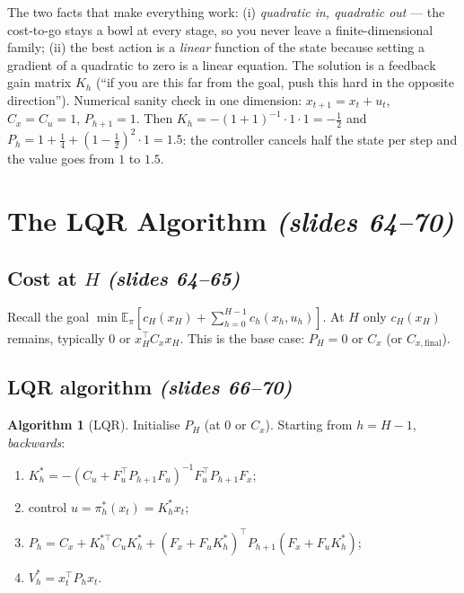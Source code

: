 \documentclass[11pt,a4paper]{article}
\newcommand{\E}{\mathbb{E}}
\newcommand{\slides}[1]{\emph{(slides #1)}}
\theoremstyle{plain}
\theoremstyle{definition}
\newtheorem{algorithm}[theorem]{Algorithm}
\theoremstyle{remark}
\begin{document}
\begin{intuition}
The two facts that make everything work: (i) \emph{quadratic in, quadratic out} --- the cost-to-go stays a bowl at every stage, so you never leave a finite-dimensional family; (ii) the best action is a \emph{linear} function of the state because setting a gradient of a quadratic to zero is a linear equation. The solution is a feedback gain matrix $K_h$ (``if you are this far from the goal, push this hard in the opposite direction''). Numerical sanity check in one dimension: $x_{t+1}=x_t+u_t$, $C_x=C_u=1$, $P_{h+1}=1$. Then $K_h=-(1+1)^{-1}\cdot1\cdot1=-\tfrac12$ and $P_h=1+\tfrac14+(1-\tfrac12)^2\cdot1=1.5$: the controller cancels half the state per step and the value goes from $1$ to $1.5$.
\end{intuition}

\section{The LQR Algorithm \slides{64--70}}

\subsection{Cost at $H$ \slides{64--65}}

Recall the goal $\min\E_\pi[c_H(x_H)+\sum_{h=0}^{H-1}c_h(x_h,u_h)]$. At $H$ only $c_H(x_H)$ remains, typically $0$ or $x_H^\top C_xx_H$. This is the base case: $P_H=0$ or $C_x$ (or $C_{x,\mathrm{final}}$).

\subsection{LQR algorithm \slides{66--70}}

\begin{algorithm}[LQR]\label{alg:lqr}
Initialise $P_H$ (at $0$ or $C_x$). Starting from $h=H-1$, \emph{backwards}:
\begin{enumerate}[nosep]
  \item $K^*_h=-(C_u+F_u^\top P_{h+1}F_u)^{-1}F_u^\top P_{h+1}F_x$;
  \item control $u=\pi^*_h(x_t)=K^*_hx_t$;
  \item $P_h=C_x+K_h^{*\top}C_uK^*_h+(F_x+F_uK^*_h)^\top P_{h+1}(F_x+F_uK^*_h)$;
  \item $V^*_h=x_t^\top P_hx_t$.
\end{enumerate}
\end{algorithm}
\end{document}
